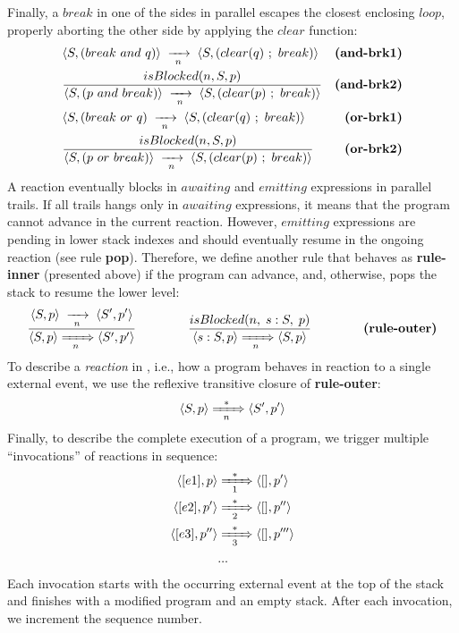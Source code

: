 Finally, a $break$ in one of the sides in parallel escapes the closest 
enclosing $loop$, properly aborting the other side by applying the $clear$ 
function:
%
{ \setlength{\jot}{20pt}
\begin{eqnarray*}
& \LL S, (break~and~q) \RR \ST \LL S, (clear(q)~;~break) \RR
    & \textbf{(and-brk1)}   \\
& \frac
    {\DS isBlocked(n,S,p) }
    {\DS \LL S, (p~and~break) \RR \ST \LL S, (clear(p)~;~break) \RR }
    & \textbf{(and-brk2)}   \\
& \LL S, (break~or~q) \ST \LL S, (clear(q)~;~break) \RR
    & \textbf{(or-brk1)}   \\
& \frac
    {\DS isBlocked(n,S,p) }
    {\DS \LL S, (p~or~break) \RR \ST \LL S, (clear(p)~;~break) \RR }
    & \textbf{(or-brk2)}   %
\end{eqnarray*}
}
%
A reaction eventually blocks in $awaiting$ and $emitting$ expressions in 
parallel trails.
%
If all trails hangs only in $awaiting$ expressions, it means that the program 
cannot advance in the current reaction.
%
However, $emitting$ expressions are pending in lower stack indexes and should 
eventually resume in the ongoing reaction (see rule \textbf{pop}).
%
Therefore, we define another rule that behaves as \textbf{rule-inner} 
(presented above) if the program can advance, and, otherwise, pops the stack to 
resume the lower level:
%
$$
\frac
    { \DS \LL S,p \RR \ST                   \LL S',p' \RR }
    {     \LL S,p \RR \xRightarrow[~~n~~]{} \LL S',p' \RR }
%
\5\5\5
%
\frac
    { \DS isBlocked(n,\1s:S,\1p) }
    { \LL s:S,p \RR \xRightarrow[~~n~~]{} \LL S,p \RR }
\5\5\5\textbf{(rule-outer)}
$$
%
To describe a \emph{reaction} in \CEU, i.e., how a program behaves in reaction 
to a single external event, we use the reflexive transitive closure of 
\textbf{rule-outer}:
%
$$
    \langle S,p \rangle \xRightarrow[~~n~~]{*} \langle S',p' \rangle
$$
%
Finally, to describe the complete execution of a program, we trigger multiple 
``invocations'' of reactions in sequence:
%
\begin{align*}
\langle [e1], p \rangle
    & \xRightarrow[~~1~~]{*}
\langle [  ], p' \rangle
\\
\langle [e2], p' \rangle
    & \xRightarrow[~~2~~]{*}
\langle [  ], p'' \rangle
\\
\langle [e3], p'' \rangle
    & \xRightarrow[~~3~~]{*}
\langle [  ], p''' \rangle
\\
& ...
\end{align*}
%
Each invocation starts with the occurring external event at the top of the 
stack and finishes with a modified program and an empty stack.
After each invocation, we increment the sequence number.

